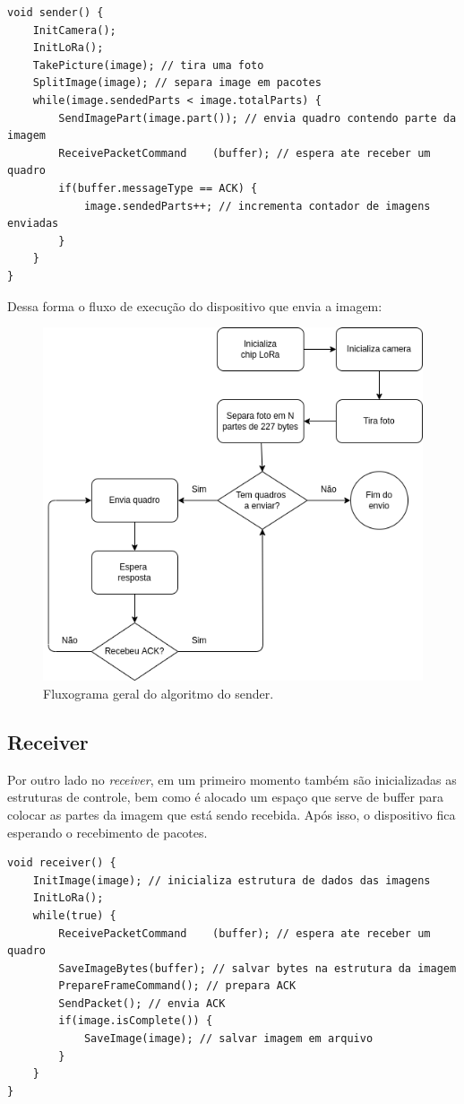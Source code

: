 \documentclass[
article,			%
12pt,				%
oneside,			%
a4paper,			%
english,			%
brazil,				%
sumario=tradicional
]{abntex2}
\begin{document}
\begin{lstlisting}[title=Algoritmo Stop and Wait - Sender]
void sender() {
	InitCamera();
	InitLoRa();
	TakePicture(image); // tira uma foto
	SplitImage(image); // separa image em pacotes
	while(image.sendedParts < image.totalParts) {
		SendImagePart(image.part()); // envia quadro contendo parte da imagem
		ReceivePacketCommand	(buffer); // espera ate receber um quadro
		if(buffer.messageType == ACK) {
			image.sendedParts++; // incrementa contador de imagens enviadas
		}
	}
}
\end{lstlisting}

Dessa forma o fluxo de execução do dispositivo que envia a imagem:

\cleardoublepage
\begin{figure}[h]
  \centering
  \includegraphics[width=.7\textwidth]{fluxogram_sender}
  \caption{\label{fig:sender}Fluxograma geral do algoritmo do sender.}
\end{figure}

\subsection{Receiver}\label{Receiver}
Por outro lado no \textit{receiver}, em um primeiro momento também são inicializadas as estruturas de controle, bem como é alocado um espaço que serve de buffer para colocar as partes da imagem que está sendo recebida. Após isso, o dispositivo fica esperando o recebimento de pacotes.

\begin{lstlisting}[title=Algoritmo Stop and Wait - Receiver]
void receiver() {
	InitImage(image); // inicializa estrutura de dados das imagens
	InitLoRa();
	while(true) {
		ReceivePacketCommand	(buffer); // espera ate receber um quadro
		SaveImageBytes(buffer); // salvar bytes na estrutura da imagem
		PrepareFrameCommand(); // prepara ACK
		SendPacket(); // envia ACK
		if(image.isComplete()) {
			SaveImage(image); // salvar imagem em arquivo
		}
	}
}
\end{lstlisting}
\cleardoublepage
\end{document}
